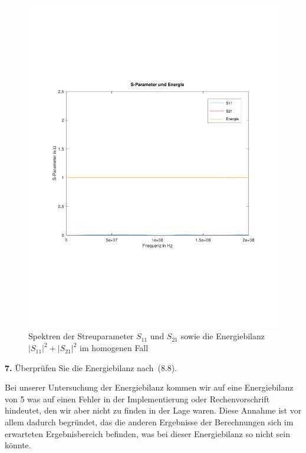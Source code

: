 \documentclass[Protokollheft.tex]{subfiles}
\begin{document}
\begin{figure}
	\centering
	\includegraphics[trim = 15mm 65mm 15mm 65mm, clip,width=0.7\linewidth]{SParameterEnergie}
	\caption{Spektren der Streuparameter $S_{11}$ und $S_{21}$ sowie die Energiebilanz $|S_{11}|^2 + |S_{21}|^2$ im homogenen Fall}
	\label{fig:sparameterenergie}
\end{figure}


\begin{framed}
	\noindent \textbf{7.} Überprüfen Sie die Energiebilanz nach~(8.8).\label{exer:checkEnergyBal4TLine}
\end{framed}
\noindent
Bei unserer Untersuchung der Energiebilanz kommen wir auf eine Energiebilanz von 5 was auf einen Fehler in der Implementierung oder Rechenvorschrift hindeutet, den wir aber nicht zu finden in der Lage waren. Diese Annahme ist vor allem dadurch begründet, das die anderen Ergebnisse der Berechnungen sich im erwarteten Ergebnisbereich befinden, was bei dieser Energiebilanz so nicht sein könnte. 
\end{document}
